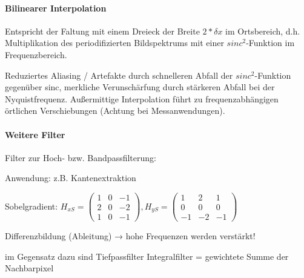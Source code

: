\documentclass[landscape]{article}
\begin{document}
\begin{multicols}{3}
  \paragraph{Bilinearer Interpolation}
  \begin{itemize*}
    \item Entspricht der Faltung mit einem Dreieck der Breite $2*\delta x$ im Ortsbereich, d.h. Multiplikation des periodifizierten Bildspektrums mit einer $sinc^2$-Funktion im Frequenzbereich.
    \item Reduziertes Aliasing / Artefakte durch schnelleren Abfall der $sinc^2$-Funktion gegenüber sinc, merkliche Verunschärfung durch stärkeren Abfall bei der Nyquistfrequenz. Außermittige Interpolation führt zu frequenzabhängigen örtlichen Verschiebungen (Achtung bei Messanwendungen).
  \end{itemize*}
  
  \paragraph{Weitere Filter}
  \begin{itemize*}
    \item Filter zur Hoch- bzw. Bandpassfilterung:
    \item Anwendung: z.B. Kantenextraktion
    \item Sobelgradient: $H_{xS} =\begin{pmatrix} 1&0&-1\\ 2&0&-2\\ 1&0&-1\end{pmatrix}, H_{yS}=\begin{pmatrix} 1&2&1\\ 0&0&0\\ -1&-2&-1 \end{pmatrix}$
    \item Differenzbildung (Ableitung) → hohe Frequenzen werden verstärkt!
    \item im Gegensatz dazu sind Tiefpassfilter Integralfilter = gewichtete Summe der Nachbarpixel
  \end{itemize*}
  
  
\end{multicols}
\end{document}
